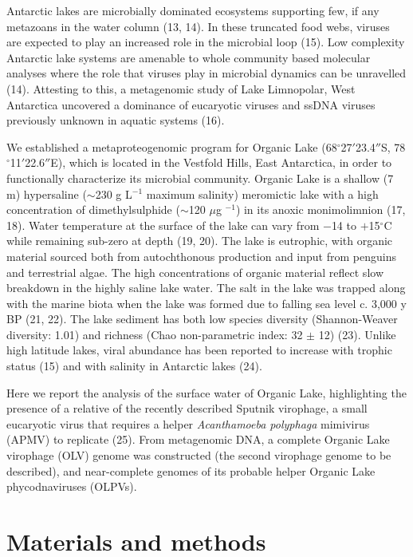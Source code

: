 Antarctic lakes are microbially dominated ecosystems supporting few, if any metazoans in the water column (13, 14). 
In these truncated food webs, viruses are expected to play an increased role in the microbial loop (15). 
Low complexity Antarctic lake systems are amenable to whole community based molecular analyses where the role that viruses play in microbial dynamics can be unravelled (14). 
Attesting to this, a metagenomic study of Lake Limnopolar, West Antarctica uncovered a dominance of eucaryotic viruses and ssDNA viruses previously unknown in aquatic systems (16). 

We established a metaproteogenomic program for Organic Lake (68$^{\circ}$27$'$23.4$''$S, 78$^{\circ}$11$'$22.6$''$E), which is located in the Vestfold Hills, East Antarctica, in order to functionally characterize its microbial community. 
Organic Lake is a shallow (7 m) hypersaline ($\sim$230 g L$^{-1}$ maximum salinity) meromictic lake with a high concentration of dimethylsulphide ($\sim$120 $\mu$g $^{-1}$) in its anoxic monimolimnion (17, 18). 
Water temperature at the surface of the lake can vary from $-$14 to $+$15$^{\circ}$C while remaining sub-zero at depth (19, 20). 
The lake is eutrophic, with organic material sourced both from autochthonous production and input from penguins and terrestrial algae. 
The high concentrations of organic material reflect slow breakdown in the highly saline lake water. 
The salt in the lake was trapped along with the marine biota when the lake was formed due to falling sea level c. 3,000 y BP (21, 22). The lake sediment has both low species diversity (Shannon-Weaver diversity: 1.01) and richness (Chao non-parametric index: 32 $\pm$ 12) (23). 
Unlike high latitude lakes, viral abundance has been reported to increase with trophic status (15) and with salinity in Antarctic lakes (24). 

Here we report the analysis of the surface water of Organic Lake, highlighting the presence of a relative of the recently described Sputnik virophage, a small eucaryotic virus that requires a helper \emph{Acanthamoeba polyphaga} mimivirus (APMV) to replicate (25). 
From metagenomic DNA, a complete Organic Lake virophage (OLV) genome was constructed (the second virophage genome to be described), and near-complete genomes of its probable helper Organic Lake phycodnaviruses (OLPVs).


\section{Materials and methods}

